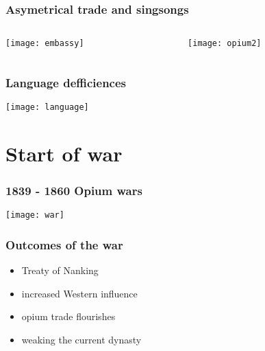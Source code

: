\documentclass[9pt]{beamer}
\begin{document}
\begin{frame}
	\frametitle{Asymetrical trade and singsongs}

	\centering
	\begin{columns}
		\begin{column}{.5\textwidth}
		\texttt{[image: embassy]}
		\end{column}
		\begin{column}{.5\textwidth}
		\texttt{[image: opium2]}
		\end{column}

	\end{columns}
\end{frame}

\begin{frame}
	\frametitle{Language defficiences}

	\texttt{[image: language]}
\end{frame}

\section{Start of war}

\begin{frame}
	\frametitle{1839 - 1860 Opium wars}
	
	\centering
	\texttt{[image: war]}
\end{frame}

\begin{frame}
	\frametitle{Outcomes of the war}

	\begin{itemize}
		\item Treaty of Nanking
		\item increased Western influence
		\item opium trade flourishes
		\item weaking the current dynasty
	\end{itemize}
\end{frame}
\end{document}
